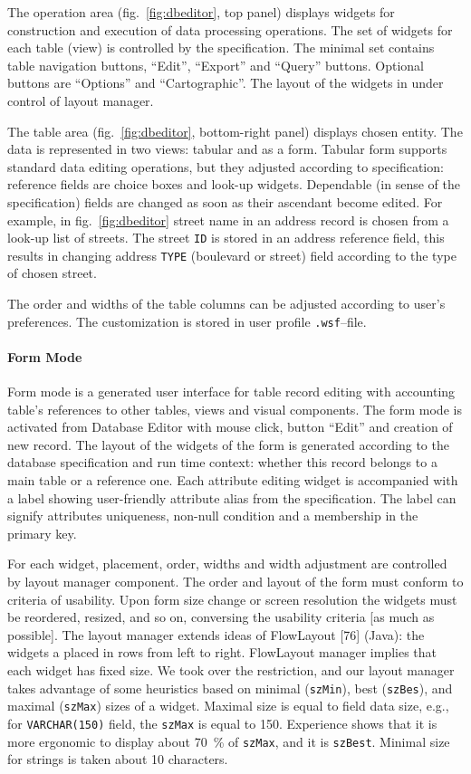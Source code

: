 \documentclass[conference]{IEEEtran}
\newcommand{\e}[2][fcolor]{\textcolor{pcolor}{[}\textcolor{#1}{#2}\textcolor{pcolor}{]}}
\begin{document}
The operation area (fig.~\ref{fig:dbeditor}, top panel) displays widgets for construction and execution of data processing operations.  The set of widgets for each table (view) is controlled by the specification.  The minimal set contains table navigation buttons, ``Edit'', ``Export'' and ``Query'' buttons.  Optional buttons are ``Options'' and ``Cartographic''.  The layout of the widgets in under control of layout manager.

The table area (fig.~\ref{fig:dbeditor}, bottom-right panel) displays chosen entity.  The data is represented in two views: tabular and as a form.  Tabular form supports standard data editing operations, but they adjusted according to specification: reference fields are choice boxes and look-up widgets.  Dependable (in sense of the specification) fields are changed as soon as their ascendant become edited.  For example, in fig.~\ref{fig:dbeditor} street name in an address record is chosen from a look-up list of streets.  The street \texttt{ID} is stored in an address reference field, this results in changing address \texttt{TYPE} (boulevard or street) field according to the type of chosen street.

The order and widths of the table columns can be adjusted according to user's preferences.  The customization is stored in user profile \texttt{.wsf}--file.

\paragraph{Form Mode}

Form mode is a generated user interface for table record editing with accounting table's references to other tables, views and visual components.  The form mode is activated from Database Editor with mouse click, button ``Edit'' and creation of new record.  The layout of the widgets of the form is generated according to the database specification and run time context: whether this record belongs to a main table or a reference one.  Each attribute editing widget is accompanied with a label showing user-friendly attribute alias from the specification.  The label can signify attributes uniqueness, non-null condition and a membership in the primary key.

For each widget, placement, order, widths and width adjustment are controlled by layout manager component.  The order and layout of the form must conform to criteria of usability.  Upon form size change or screen resolution the widgets must be reordered, resized, and so on, conversing the usability criteria \e{as much as possible}.  The layout manager extends ideas of FlowLayout [76] (Java): the widgets a placed in rows from left to right.  FlowLayout manager implies that each widget has fixed size.  We took over the restriction, and our layout manager takes advantage of some heuristics based on minimal (\texttt{szMin}), best (\texttt{szBes}), and maximal (\texttt{szMax}) sizes of a widget.  Maximal size is equal to field data size, e.g., for \texttt{VARCHAR(150)} field, the \texttt{szMax} is equal to 150.  Experience shows that it is more ergonomic to display about 70~\% of \texttt{szMax}, and it is \texttt{szBest}.  Minimal size for strings is taken about 10 characters.
\end{document}
